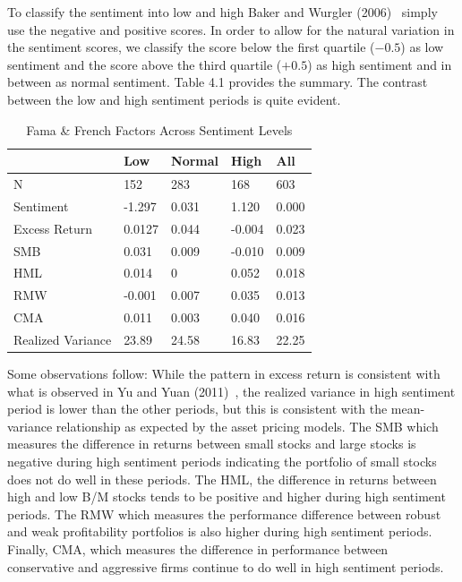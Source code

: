 To classify the sentiment into low and high Baker and Wurgler (2006)~\cite{baker2006investor} simply use the negative and positive scores. In order to allow for the natural variation in the sentiment scores, we classify the score below the first quartile ($-0.5$) as low sentiment and the score above the third quartile ($+0.5$) as high sentiment and in between as normal sentiment. Table 4.1 provides the summary. The contrast between the low and high sentiment periods is quite evident.

\begin{table}[!ht]
\caption{Fama \& French Factors Across Sentiment Levels \label{tab:famafrench}}
	\begin{tabular}{lllll}
& Low &     Normal      & High & All \\ \hline

N & 152 &  283  & 168 & 603 \\

Sentiment & -1.297 &  0.031  & 1.120 & 0.000 \\

Excess Return & 0.0127 &  0.044  & -0.004 & 0.023 \\ 

SMB & 0.031 &  0.009  & -0.010 & 0.009 \\

HML & 0.014 & 0 & 0.052 & 0.018 \\

RMW & -0.001 &  0.007  & 0.035& 0.013 \\

CMA & 0.011 &  0.003  & 0.040 & 0.016 \\
 
Realized Variance & 23.89 &  24.58  & 16.83 & 22.25
	\end{tabular}
\end{table}

Some observations follow: While the pattern in excess return is consistent with what is observed in Yu and Yuan (2011)~\cite{yuyuan}, the realized variance in high sentiment period is lower than the other periods, but this is consistent with the mean-variance relationship as expected by the asset pricing models. The SMB which measures the difference in returns between small stocks and large stocks is negative during high sentiment periods indicating the portfolio of small stocks does not do well in these periods. The HML, the difference in returns between high and low B/M stocks tends to be positive and higher during high sentiment periods. The RMW which measures the performance difference between robust and weak profitability portfolios is also higher during high sentiment periods. Finally, CMA, which measures the difference in performance between conservative and aggressive firms continue to do well in high sentiment periods.


